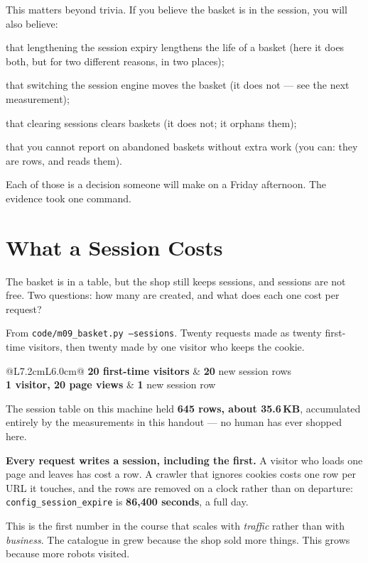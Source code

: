 \begin{alertbox}
This matters beyond trivia. If you believe the basket is in the session, you
will also believe:

\begin{tight}
  \item that lengthening the session expiry lengthens the life of a basket
        (here it does both, but for two different reasons, in two places);
  \item that switching the session engine moves the basket (it does not --- see
        the next measurement);
  \item that clearing sessions clears baskets (it does not; it orphans them);
  \item that you cannot report on abandoned baskets without extra work (you
        can: they are rows, and  reads them).
\end{tight}

Each of those is a decision someone will make on a Friday afternoon. The
evidence took one command.
\end{alertbox}

\section{What a Session Costs}

The basket is in a table, but the shop still keeps sessions, and sessions are
not free. Two questions: how many are created, and what does each one cost per
request?

\begin{measured}
From \texttt{code/m09\_basket.py --sessions}. Twenty requests made as twenty
first-time visitors, then twenty made by one visitor who keeps the cookie.

\smallskip
\begin{tabular}{@{}L{7.2cm}L{6.0cm}@{}}
\textbf{20 first-time visitors} & \textbf{20} new session rows \\
\textbf{1 visitor, 20 page views} & \textbf{1} new session row \\
\end{tabular}

\smallskip
The session table on this machine held \textbf{645 rows, about 35.6\,KB},
accumulated entirely by the measurements in this handout --- no human has ever
shopped here.

\smallskip
\textbf{Every request writes a session, including the first.} A visitor who
loads one page and leaves has cost a row. A crawler that ignores cookies costs
one row per URL it touches, and the rows are removed on a clock rather than on
departure: \texttt{config\_session\_expire} is \textbf{86{,}400 seconds},
a full day.

\smallskip
This is the first number in the course that scales with \emph{traffic} rather
than with \emph{business}. The catalogue in  grew because the
shop sold more things. This grows because more robots visited.
\end{measured}


